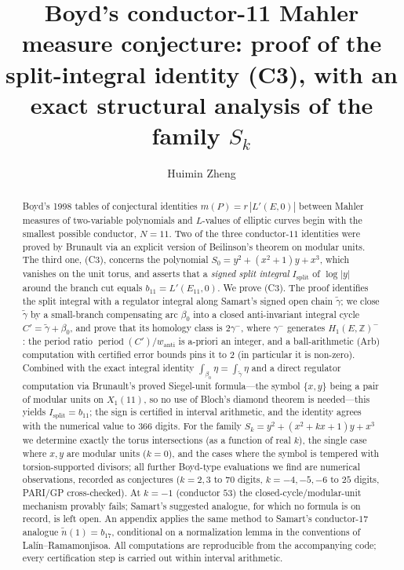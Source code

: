 \documentclass[preprint,12pt]{elsarticle}
\theoremstyle{definition}
\theoremstyle{remark}
\newcommand{\Z}{\mathbb{Z}}
\DeclareMathOperator{\period}{period}
\begin{document}
\begin{frontmatter}

\title{Boyd's conductor-11 Mahler measure conjecture: proof of the
split-integral identity (C3), with an exact structural analysis of the
family \texorpdfstring{$S_k$}{Sk}}

\author[ahstu]{Huimin Zheng}

\begin{abstract}
Boyd's 1998 tables of conjectural identities $m(P)=r\,|L'(E,0)|$ between
Mahler measures of two-variable polynomials and $L$-values of elliptic curves
begin with the smallest possible conductor, $N=11$. Two of the three
conductor-$11$ identities were proved by Brunault via an explicit version of
Beilinson's theorem on modular units. The third one, (C3), concerns the
polynomial $S_0=y^2+(x^2+1)y+x^3$, which vanishes on the unit torus, and
asserts that a \emph{signed split integral} $I_{\mathrm{split}}$ of $\log|y|$
around the branch cut equals $b_{11}=L'(E_{11},0)$. We prove (C3). The proof
identifies the split integral with a regulator integral along Samart's signed
open chain $\tilde\gamma$; we close $\tilde\gamma$ by a small-branch
compensating arc $\beta_0$ into a closed anti-invariant integral cycle
$C'=\tilde\gamma+\beta_0$, and prove that its homology class is $2\gamma^-$,
where $\gamma^-$ generates $H_1(E,\Z)^-$: the period ratio
$\period(C')/w_{\mathrm{anti}}$ is a-priori an integer, and a
ball-arithmetic (Arb) computation with certified error bounds pins it to
$2$ (in particular it is non-zero). Combined with the exact integral identity
$\int_{\beta_0}\eta=\int_{\tilde\gamma}\eta$ and a direct regulator
computation via Brunault's proved Siegel-unit formula---the symbol
$\{x,y\}$ being a pair of modular units on $X_1(11)$, so no use of Bloch's
diamond theorem is needed---this yields $I_{\mathrm{split}}=b_{11}$; the sign is certified in interval
arithmetic, and the identity agrees with the numerical value to $366$
digits. For the family $S_k=y^2+(x^2+kx+1)y+x^3$ we determine exactly the
torus intersections (as a function of real $k$), the single case where
$x,y$ are modular units ($k=0$), and the cases where the symbol is
tempered with torsion-supported divisors; all further Boyd-type evaluations
we find are numerical
observations, recorded as conjectures ($k=2,3$ to $70$ digits, $k=-4,-5,-6$
to $25$ digits, PARI/GP cross-checked). At $k=-1$ (conductor $53$) the
closed-cycle/modular-unit mechanism provably fails; Samart's suggested
analogue, for which no formula is on record, is left open. An appendix
applies the same method to Samart's conductor-$17$ analogue
$\tilde n(1)=b_{17}$, conditional on a normalization lemma in the
conventions of Lal\'in--Ramamonjisoa. All computations are
reproducible from the accompanying
code; every certification step is carried out within
interval arithmetic.
\end{abstract}


\end{frontmatter}
\end{document}
